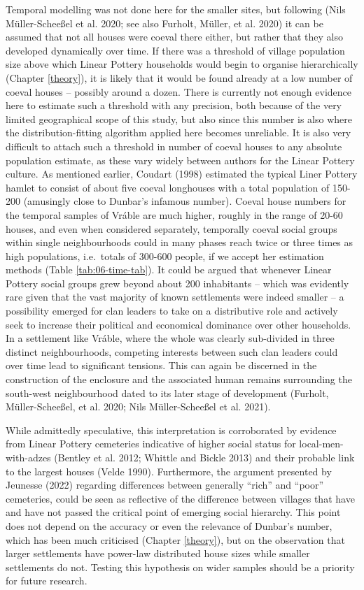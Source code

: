 \documentclass[
  12pt,
  a4paper, twoside]{book}
\begin{document}
Temporal modelling was not done here for the smaller sites, but following (Nils Müller-Scheeßel et al. 2020; see also Furholt, Müller, et al. 2020) it can be assumed that not all houses were coeval there either, but rather that they also developed dynamically over time. If there was a threshold of village population size above which Linear Pottery households would begin to organise hierarchically (Chapter \ref{theory}), it is likely that it would be found already at a low number of coeval houses -- possibly around a dozen. There is currently not enough evidence here to estimate such a threshold with any precision, both because of the very limited geographical scope of this study, but also since this number is also where the distribution-fitting algorithm applied here becomes unreliable. It is also very difficult to attach such a threshold in number of coeval houses to any absolute population estimate, as these vary widely between authors for the Linear Pottery culture. As mentioned earlier, Coudart (1998) estimated the typical Liner Pottery hamlet to consist of about five coeval longhouses with a total population of 150-200 (amusingly close to Dunbar's infamous number). Coeval house numbers for the temporal samples of Vráble are much higher, roughly in the range of 20-60 houses, and even when considered separately, temporally coeval social groups within single neighbourhoods could in many phases reach twice or three times as high populations, i.e.~totals of 300-600 people, if we accept her estimation methods (Table \ref{tab:06-time-tab}). It could be argued that whenever Linear Pottery social groups grew beyond about 200 inhabitants -- which was evidently rare given that the vast majority of known settlements were indeed smaller -- a possibility emerged for clan leaders to take on a distributive role and actively seek to increase their political and economical dominance over other households. In a settlement like Vráble, where the whole was clearly sub-divided in three distinct neighbourhoods, competing interests between such clan leaders could over time lead to significant tensions. This can again be discerned in the construction of the enclosure and the associated human remains surrounding the south-west neighbourhood dated to its later stage of development (Furholt, Müller-Scheeßel, et al. 2020; Nils Müller-Scheeßel et al. 2021).

While admittedly speculative, this interpretation is corroborated by evidence from Linear Pottery cemeteries indicative of higher social status for local-men-with-adzes (Bentley et al. 2012; Whittle and Bickle 2013) and their probable link to the largest houses (Velde 1990). Furthermore, the argument presented by Jeunesse (2022) regarding differences between generally ``rich'' and ``poor'' cemeteries, could be seen as reflective of the difference between villages that have and have not passed the critical point of emerging social hierarchy. This point does not depend on the accuracy or even the relevance of Dunbar's number, which has been much criticised (Chapter \ref{theory}), but on the observation that larger settlements have power-law distributed house sizes while smaller settlements do not. Testing this hypothesis on wider samples should be a priority for future research.
\end{document}
